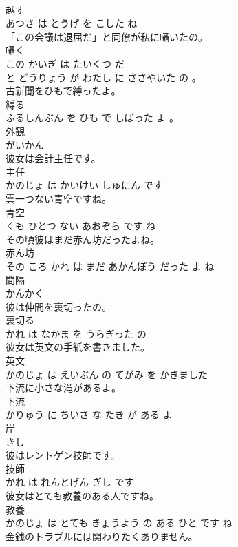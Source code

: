 \documentclass[8pt]{extreport}
\begin{document}
\begin{CJK}{UTF8}{min}
\\	越す 
\\	あつさ は とうげ を こした ね			
\\	「この会議は退屈だ」と同僚が私に囁いたの。	
\\	囁く 
\\	この かいぎ は たいくつ だ 
\\	と どうりょう が わたし に ささやいた の 。			
\\	古新聞をひもで縛ったよ。	
\\	縛る 
\\	ふるしんぶん を ひも で しばった よ 。			
\\	外観	
\\	がいかん			
\\	彼女は会計主任です。	
\\	主任 
\\	かのじょ は かいけい しゅにん です			
\\	雲一つない青空ですね。	
\\	青空 
\\	くも ひとつ ない あおぞら です ね			
\\	その頃彼はまだ赤ん坊だったよね。	
\\	赤ん坊 
\\	その ころ かれ は まだ あかんぼう だった よ ね			
\\	間隔	
\\	かんかく			
\\	彼は仲間を裏切ったの。	
\\	裏切る 
\\	かれ は なかま を うらぎった の			
\\	彼女は英文の手紙を書きました。	
\\	英文 
\\	かのじょ は えいぶん の てがみ を かきました			
\\	下流に小さな滝があるよ。	
\\	下流 
\\	かりゅう に ちいさ な たき が ある よ			
\\	岸	
\\	きし			
\\	彼はレントゲン技師です。	
\\	技師 
\\	かれ は れんとげん ぎし です			
\\	彼女はとても教養のある人ですね。	
\\	教養 
\\	かのじょ は とても きょうよう の ある ひと です ね			
\\	金銭のトラブルには関わりたくありません。	

\end{CJK}
\end{document}
